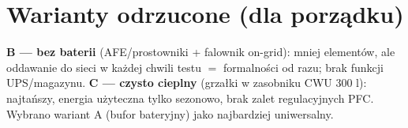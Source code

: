 \documentclass[11pt,a4paper]{article}
\begin{document}
\section{Warianty odrzucone (dla porządku)}
\textbf{B --- bez baterii} (AFE/prostowniki + falownik on-grid): mniej elementów, ale oddawanie do sieci
w każdej chwili testu $=$ formalności od razu; brak funkcji UPS/magazynu. \textbf{C --- czysto cieplny}
(grzałki w zasobniku CWU 300 l): najtańszy, energia użyteczna tylko sezonowo, brak zalet regulacyjnych PFC.
Wybrano wariant A (bufor bateryjny) jako najbardziej uniwersalny.
\end{document}
